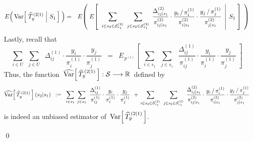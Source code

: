 \begin{enumerate}
	\begin{eqnarray*}
	E\!\left(\, \textnormal{Var}\!\left[\, \left.\widehat{T}^{\,(2 \vert 1)}_{y} \;\right\vert\, S_{1} \,\right] \;\right)
	& = &
		E\!\left(\;E\!\left[\;\,
		\left.
			\underset{i \in s_{2} \in \mathcal{S}^{(2)}_{s_{1}} }{\sum}\;\;
			\underset{j \in s_{2} \in \mathcal{S}^{(2)}_{s_{1}} }{\sum}\;\,
				\dfrac{ \Delta^{(2)}_{ij \vert s_{1}} }{ \pi^{(2)}_{ij \vert s_{1}} }
				\cdot
				\dfrac{ y_{i} \,/\, \pi^{(1)}_{i} }{ \pi^{(2)}_{i \vert s_{1}} }
				\cdot
				\dfrac{ y_{j} \,/\, \pi^{(1)}_{j} }{ \pi^{(2)}_{j \vert s_{1}} }
		\;\,\right\vert\;
			S_{1}
		\;\right]\;\,\right)
	\end{eqnarray*}
	Lastly, recall that
	\begin{equation*}
		\underset{i \in U}{\sum}\;\,
		\underset{j \in U}{\sum}\;\;
			\Delta^{(1)}_{ij}
			\cdot
			\dfrac{y_{i}}{\pi^{(1)}_{i}}
			\cdot
			\dfrac{y_{j}}{\pi^{(1)}_{j}}
	\;\; = \;\;
		E_{\,p^{(1)}}\!\!\left[\;\,
			\underset{i \in s_{1}}{\sum}\;\,
			\underset{j \in s_{1}}{\sum}\;\;
				\dfrac{ \Delta^{(1)}_{ij} }{ \pi^{(1)}_{ij} }
				\cdot
				\dfrac{y_{i}}{\pi^{(1)}_{i}}
				\cdot
				\dfrac{y_{j}}{\pi^{(1)}_{j}}
		\;\right]
	\end{equation*}
	Thus, the function
	\,$\widehat{\textnormal{Var}}\!\left[\,\widehat{T}^{\,(2 \vert 1)}_{y}\,\right] : \mathcal{S} \longrightarrow \mathbb{R}$\,
	defined by
	\begin{equation*}
	\widehat{\textnormal{Var}}\!\left[\,\widehat{T}^{\,(2 \vert 1)}_{y}\,\right](s_{2} \vert s_{1})
	\;\; := \;\;
		\underset{i \in s_{1}}{\sum}\;\,
		\underset{j \in s_{1}}{\sum}\;\;
			\dfrac{ \Delta^{(1)}_{ij} }{ \pi^{(1)}_{ij} }
			\cdot
			\dfrac{y_{i}}{\pi^{(1)}_{i}}
			\cdot
			\dfrac{y_{j}}{\pi^{(1)}_{j}}
		\;\, + \,
		\underset{i \in s_{2} \in \mathcal{S}^{(2)}_{s_{1}} }{\sum}\;\;
		\underset{j \in s_{2} \in \mathcal{S}^{(2)}_{s_{1}} }{\sum}\;\,
			\dfrac{ \Delta^{(2)}_{ij \vert s_{1}} }{ \pi^{(2)}_{ij \vert s_{1}} }
			\cdot
			\dfrac{ y_{i} \,/\, \pi^{(1)}_{i} }{ \pi^{(2)}_{i \vert s_{1}} }
			\cdot
			\dfrac{ y_{j} \,/\, \pi^{(1)}_{j} }{ \pi^{(2)}_{j \vert s_{1}} }
	\end{equation*}
	is indeed an unbiased estimator of \,$\textnormal{Var}\!\left[\,\widehat{T}^{\,(2 \vert 1)}_{y}\,\right]$.
\end{enumerate}
\qed


\renewcommand{\theenumi}{\roman{enumi}}
\renewcommand{\labelenumi}{\textnormal{(\theenumi)}$\;\;$}
